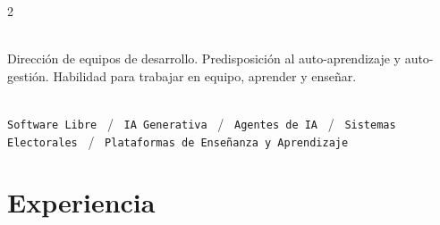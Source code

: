 \documentclass[lighthipster]{simplehipstercv}
\begin{document}
\begin{paracol}{2}
{\bigskip

\\[0.5em]
Dirección de equipos de desarrollo.
Predisposición al auto-aprendizaje y auto-gestión.
Habilidad para trabajar en equipo, aprender y enseñar.
\bigskip

\\[0.5em]

\texttt{Software Libre} ~/~ \texttt{IA Generativa} ~/~ \texttt{Agentes de IA} ~/~ \texttt{Sistemas Electorales} ~/~  \texttt{Plataformas de Enseñanza y Aprendizaje} 

\vspace{2em}
\bigskip

\phantom{turn the page}

\phantom{turn the page}
}
\switchcolumn

\small
\section*{Experiencia}


\end{paracol}
\end{document}

